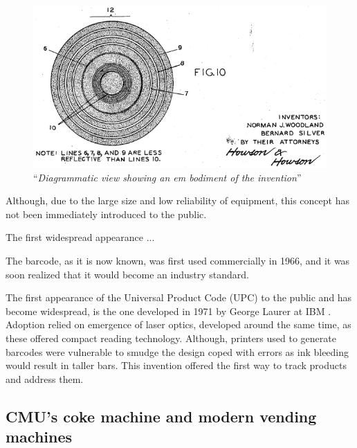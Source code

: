 		\begin{figure}[h!]
			\centering
			\includegraphics[width=\textwidth-4cm]{resources/img/upc_1}
			\caption{``\textit{Diagrammatic view showing an em bodiment of the invention}''}
			\label{fig:upc_patent}
		\end{figure}
		
		Although, due to the large size and low reliability of equipment, this concept has not been immediately introduced to the public.
	
	
	
	
	
		The first widespread appearance ... 
	
		The barcode, as it is now known, was first used commercially in 1966, and it was soon realized that it would become an industry standard.
		
		The first appearance of the Universal Product Code (UPC) to the public and has become widespread, is the one developed in 1971 by George Laurer at IBM \cite{upc_ibm}.
		Adoption relied on emergence of laser optics, developed around the same time, as these offered compact reading technology.
		Although, printers used to generate barcodes were vulnerable to smudge the design coped with errors as ink bleeding would result in taller bars.
		This invention offered the first way to track products and address them.
		


	\subsection{CMU's coke machine and modern vending machines}


